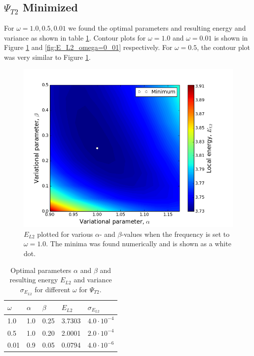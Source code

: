 \documentclass[norsk,a4paper,12pt]{article}
\begin{document}
\subsection{$\Psi_{T2}$ Minimized}
For $\omega = 1.0, 0.5, 0.01$ we found the optimal parameters and resulting energy and variance as shown in table \ref{tab:Psi2results}. Contour plots for $\omega = 1.0$ and $\omega =0.01$ is shown in Figure \ref{fig:E_L2_omega=1_0} and \ref{fig:E_L2_omega=0_01} respectively. For $\omega = 0.5$, the contour plot was very similar to Figure \ref{fig:E_L2_omega=1_0}. 
\begin{figure} [H]
    \centering
    \includegraphics[width=12cm]{E_L2_contour_omega=1_0.png}
    \caption{$E_{L2}$ plotted for various $\alpha$- and $\beta$-values when the frequency is set to $\omega=1.0$. The minima was found numerically and is shown as a white dot.}
    \label{fig:E_L2_omega=1_0}
\end{figure}

\begin{table} [H]
\centering
\caption{Optimal parameters $\alpha$ and $\beta$ and resulting energy $E_{L2}$ and variance $\sigma_{E_{L2}}$ for different $\omega$ for $\Psi_{T2}$.}
\begin{tabularx}{\textwidth}{XXXXX} \hline
\label{tab:Psi2results}
$\omega$ & $\alpha$ & $\beta$ & $E_{L2}$ & $\sigma_{E_{L2}}$ \\ \hline
1.0 & 1.0 & 0.25 & 3.7303 & $4.0\cdot 10^{-4}$ \\
0.5 & 1.0 & 0.20 & 2.0001 & $2.0\cdot 10^{-4}$ \\
0.01 & 0.9 & 0.05 & 0.0794 & $4.0\cdot 10^{-6}$ \\ \hline
\end{tabularx}
\end{table}
\end{document}
